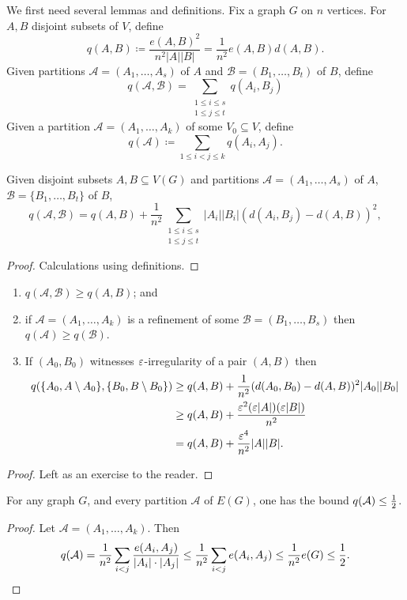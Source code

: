 \documentclass[main.tex]{subfiles}
\begin{document}
We first need several lemmas and definitions.
Fix a graph $G$ on $n$ vertices.
For $A,B$ disjoint subsets of $V$, define
\[
  q(A,B)\coloneqq\frac{e(A,B)^2}{n^2|A||B|} = \frac{1}{n^2}e(A,B) d(A,B).
\]
Given partitions $\mathcal A = (A_1,\ldots,A_s)$ of $A$ and
$\mathcal B = (B_1,\ldots,B_t)$ of $B$, define
\[
  q(\mathcal A,\mathcal B)
  = \sum_{\substack{1\leq i\leq s\\1\leq j\leq t}} q(A_i,B_j)
\]
Given a partition $\mathcal A = (A_1,\ldots,A_k)$ of some $V_0\subseteq V$,
define
\[
  q(\mathcal A)\coloneqq\sum_{1\leq i < j\leq k} q(A_i,A_j).
\]
\begin{proposition}
  Given disjoint subsets $A,B\subseteq V(G)$ and partitions
  $\mathcal A = (A_1,\ldots, A_s)$ of $A$, $\mathcal B = \{B_1,\ldots,B_t\}$
  of $B$,
  \[
    q(\mathcal A,\mathcal B) = q(A,B)
    + \frac{1}{n^2}\sum_{\substack{1\leq i\leq s\\1\leq j\leq t}}
    |A_i||B_i|(d(A_i,B_j) - d(A,B))^2,
  \]
\end{proposition}
\begin{proof}
  Calculations using definitions.
\end{proof}
\begin{corollary}
  \listhack
  \begin{enumerate}[label=(\arabic*)]
    \item $q(\mathcal A,\mathcal B)\geq q(A,B)$; and

    \item if $\mathcal A = (A_1,\ldots,A_k)$ is a refinement of some
      $\mathcal B = (B_1,\ldots,B_s)$ then $q(\mathcal A)\geq q(\mathcal B)$.

    \item If $(A_0,B_0)$ witnesses $\varepsilon$-irregularity of a pair
      $(A,B)$ then
      \begin{align*}
        q(\{A_0,A\setminus A_0\},\{B_0,B\setminus B_0\})
        &\geq q(A,B) + \frac{1}{n^2}(d(A_0,B_0)-d(A,B))^2|A_0||B_0| \\
        &\geq q(A,B) + \frac{\varepsilon^2(\varepsilon|A|)(\varepsilon|B|)}{n^2} \\
        &= q(A,B) + \frac{\varepsilon^4}{n^2}|A||B|.
      \end{align*}
  \end{enumerate}
\end{corollary}
\begin{proof}
  Left as an exercise to the reader.
\end{proof}
\begin{claim}%
  For any graph $G$, and every partition $\mathcal A$ of $E(G)$,
  one has the bound $q(\mathcal A)\leq\frac{1}{2}$.
\end{claim}
\begin{proof}
  Let $\mathcal A = (A_1,\ldots,A_k)$.
  Then
  \[
    q(\mathcal A) = \frac{1}{n^2}\sum_{i < j}\frac{e(A_i,A_j)}{|A_i|\cdot|A_j|}
    \leq\frac{1}{n^2}\sum_{i < j} e(A_i,A_j)\leq\frac{1}{n^2} e(G)\leq\frac{1}{2}.
    \qedhere
  \]
\end{proof}
\end{document}
